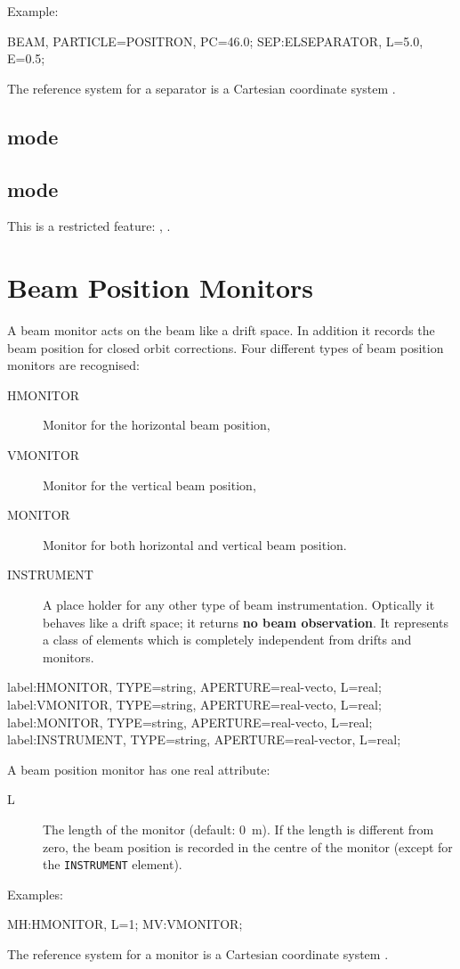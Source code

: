 \noindent Example:
\begin{example}
BEAM, PARTICLE=POSITRON, PC=46.0;
SEP:ELSEPARATOR, L=5.0, E=0.5;
\end{example}
The reference system for a separator is a
Cartesian coordinate system .
\subsection{\opalt mode}

\subsection{\opalcycl mode}

This is a restricted feature: \noopalt, \noopalcycl.

\section{Beam Position Monitors}
\label{sec:monitors}
A beam monitor acts on the beam like a drift space.
In addition it records the beam position for closed orbit
corrections.
Four different types of beam position monitors are recognised:
\begin{description}
\item[HMONITOR]
  \label{sec:hmonitor}
  Monitor for the horizontal beam position,
\item[VMONITOR]
  \label{sec:vmonitor}
  Monitor for the vertical beam position,
\item[MONITOR]
  \label{sec:monitor}
  Monitor for both horizontal and vertical beam position.
\item[INSTRUMENT]
  \label{sec:instrument}
  A place holder for any other type of beam instrumentation.
  Optically it behaves like a drift space;
  it returns \textbf{no beam observation}.
  It represents a class of elements
  which is completely independent from drifts and monitors.
\end{description}
\begin{example}
label:HMONITOR, TYPE=string, APERTURE=real-vecto, L=real;
label:VMONITOR, TYPE=string, APERTURE=real-vecto, L=real;
label:MONITOR, TYPE=string, APERTURE=real-vecto, L=real;
label:INSTRUMENT, TYPE=string, APERTURE=real-vector,
      L=real;
\end{example}
A beam position monitor has one real attribute:
\begin{description}
\item[L]
  The length of the monitor (default: 0~m).
  If the length is different from zero,
  the beam position is recorded in the centre of the monitor
  (except for the \texttt{INSTRUMENT} element).
\end{description}
\noindent Examples:
\begin{example}
MH:HMONITOR, L=1;
MV:VMONITOR;
\end{example}
The reference system for a monitor is a
Cartesian coordinate system .

